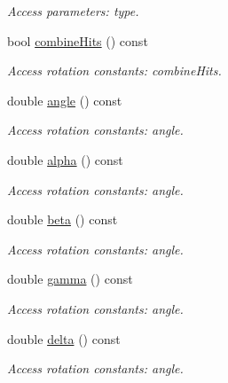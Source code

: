 \begin{DoxyCompactItemize}
\begin{DoxyCompactList}\small\item\em Access parameters: type. \item\end{DoxyCompactList}\item 
bool \hyperlink{struct_d_d4hep_1_1_x_m_l_1_1_child_value_ad81ec7ed5759f9eff9d15737529e3c82}{combineHits} () const 
\begin{DoxyCompactList}\small\item\em Access rotation constants: combineHits. \item\end{DoxyCompactList}\item 
double \hyperlink{struct_d_d4hep_1_1_x_m_l_1_1_child_value_ab42e9be4cb1e7441f943320b03fc5d70}{angle} () const 
\begin{DoxyCompactList}\small\item\em Access rotation constants: angle. \item\end{DoxyCompactList}\item 
double \hyperlink{struct_d_d4hep_1_1_x_m_l_1_1_child_value_a13ea11fa759ac9c06e68dc57b8bcbaf9}{alpha} () const 
\begin{DoxyCompactList}\small\item\em Access rotation constants: angle. \item\end{DoxyCompactList}\item 
double \hyperlink{struct_d_d4hep_1_1_x_m_l_1_1_child_value_a118eec3b47c16c56c520a6d45b72e2c5}{beta} () const 
\begin{DoxyCompactList}\small\item\em Access rotation constants: angle. \item\end{DoxyCompactList}\item 
double \hyperlink{struct_d_d4hep_1_1_x_m_l_1_1_child_value_a72f420019e5b70da9a12ed3db3d06f12}{gamma} () const 
\begin{DoxyCompactList}\small\item\em Access rotation constants: angle. \item\end{DoxyCompactList}\item 
double \hyperlink{struct_d_d4hep_1_1_x_m_l_1_1_child_value_a4f5e9e2b6d81d9accb2e1ac7ec989e3e}{delta} () const 
\begin{DoxyCompactList}\small\item\em Access rotation constants: angle. \item\end{DoxyCompactList}\item 

\end{DoxyCompactItemize}
